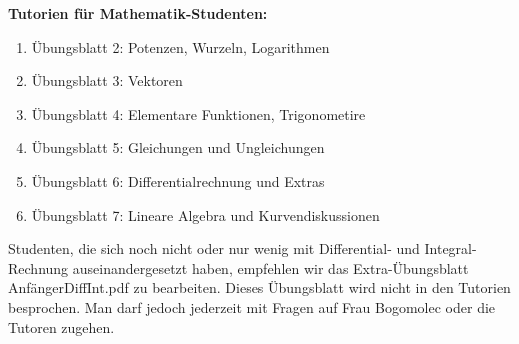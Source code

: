 \documentclass[12pt]{article}
\begin{document}
{\bf Tutorien f\"ur Mathematik-Studenten:} 

\begin{enumerate}
  \item[] \"Ubungsblatt 2: Potenzen, Wurzeln, Logarithmen
  \item[] \"Ubungsblatt 3: Vektoren
  \item[] \"Ubungsblatt 4: Elementare Funktionen, Trigonometire
  \item[] \"Ubungsblatt 5: Gleichungen und Ungleichungen
  \item[] \"Ubungsblatt 6: Differentialrechnung und Extras
  \item[] \"Ubungsblatt 7: Lineare Algebra und Kurvendiskussionen
\end{enumerate}

\vspace{0.5cm}

Studenten, die sich noch nicht oder nur wenig mit Differential- und Integral-Rechnung auseinandergesetzt haben, empfehlen wir das Extra-\"Ubungsblatt Anf\"angerDiffInt.pdf zu bearbeiten. Dieses \"Ubungsblatt wird nicht in den Tutorien besprochen. Man darf jedoch jederzeit mit Fragen auf Frau Bogomolec oder die Tutoren zugehen. \\
\end{document}
